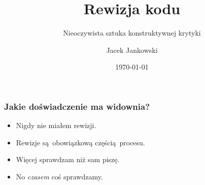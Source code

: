 \documentclass[xcolor=dvipsnames]{beamer}%
\title{Rewizja kodu}
\subtitle{Nieoczywista sztuka konstruktywnej krytyki}
\author{Jacek Jankowski}
\date{\today}  %
\begin{document}
\begin{frame}
	\titlepage
\end{frame}

\begin{frame}
	\frametitle{Jakie doświadczenie ma widownia?}
	\begin{center}
		\begin{itemize}
			\item Nigdy nie miałem rewizji.
			\item Rewizje są obowiązkową częścią procesu.
			\item Więcej sprawdzam niż sam piszę.
			\item No \textit{czasem} coś sprawdzamy.
		\end{itemize}
	\end{center}
\end{frame}
\end{document}
